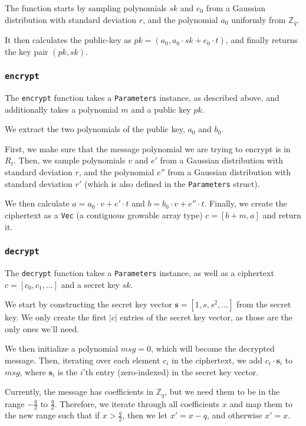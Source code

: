 \documentclass{article}
\begin{document}
The function starts by sampling polynomials $sk$ and $e_0$ from a Gaussian distribution with standard deviation $r$, and the polynomial $a_0$ uniformly from $\mathbb{Z}_q$.

It then calculates the public-key as $pk = (a_0, a_0 \cdot sk + e_0 \cdot t)$, and finally returns the key pair $(pk, sk)$.

\subsubsection{\lstinline{encrypt}}

The \lstinline{encrypt} function takes a \lstinline{Parameters} instance, as described above, and additionally takes a polynomial $m$ and a public key $pk$.

We extract the two polynomials of the public key, $a_0$ and $b_0$.

First, we make sure that the message polynomial we are trying to encrypt is in $R_t$.
Then, we sample polynomials $v$ and $e'$ from a Gaussian distribution with standard deviation $r$, and the polynomial $e''$ from a Gaussian distribution with standard deviation $r'$ (which is also defined in the \lstinline{Parameters} struct).

We then calculate $a = a_0 \cdot v + e' \cdot t$ and $b = b_0 \cdot v + e'' \cdot t$.
Finally, we create the ciphertext as a \lstinline{Vec} (a contiguous growable array type) $c = [b + m, a]$ and return it.

\subsubsection{\lstinline{decrypt}}

The \lstinline{decrypt} function takes a \lstinline{Parameters} instance, as well as a ciphertext $c = [c_0, c_1, \dots]$ and a secret key $sk$.

We start by constructing the secret key vector $\mathbf{s} = [1, s, s^2, \dots]$ from the secret key.
We only create the first $|c|$ entries of the secret key vector, as those are the only ones we'll need.

We then initialize a polynomial $msg = 0$, which will become the decrypted message.
Then, iterating over each element $c_i$ in the ciphertext, we add $c_i \cdot \mathbf{s}_i$ to $msg$, where $\mathbf{s}_i$ is the $i$'th entry (zero-indexed) in the secret key vector.

Currently, the message has coefficients in $\mathbb{Z}_q$, but we need them to be in the range $-\frac{q}{2}$ to $\frac{q}{2}$.
Therefore, we iterate through all coefficients $x$ and map them to the new range such that if $x > \frac{q}{2}$, then we let $x' = x - q$, and otherwise $x' = x$.
\end{document}
